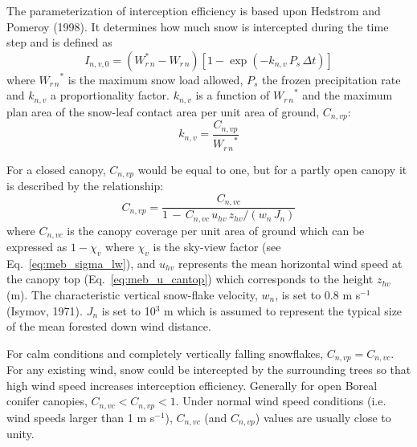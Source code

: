 The parameterization of interception efficiency 
is based upon 
Hedstrom and Pomeroy (1998)\nocite{Hedstrom98}. 
It determines how much
snow is intercepted during the time step and is defined as
%
\begin{equation}
  \label{eq:meb_rd_interceptsnow}
  I_{n,v,0} = \left(W_{r\,n}^\ast - W_{r\,n} \right) \left[1 -
    \exp\left(-k_{n,v}\,P_s\,\Delta t\right)\right]
\end{equation}
%
where ${W_{r\,n}}^\ast$ is the maximum snow load allowed, $P_s$ 
the frozen precipitation rate
and $k_{n,v}$ a proportionality factor. $k_{n,v}$ 
is a function of ${W_{r\,n}}^\ast$ and the maximum plan area of the 
snow-leaf contact area per unit area of ground, $C_{n,vp}$:
%
\begin{equation}
  \label{eq:meb_rd_coefsnowload}
  k_{n,v}=\frac{C_{n,vp}}{ {W_{r\,n}}^\ast}
\end{equation}


For a closed canopy, $C_{n,vp}$ would be equal to one, but for a
partly open canopy it is described by the relationship:
%
\begin{equation}
  \label{eq:meb_rd_closedcansnow}
  C_{n,vp}=\frac{C_{n,vc}}
{1 \,-\, C_{n,vc} \, u_{hv} \, z_{hv}/\left(w_n \, J_n\right)}
%
\end{equation}
%
where $C_{n,vc}$ is the canopy coverage per unit area of ground which
can be expressed as $1-\chi_{v}$ where $\chi_{v}$ is the sky-view
factor (see Eq.~\ref{eq:meb_sigma_lw}), and
$u_{hv}$ represents the mean horizontal wind speed at the canopy top (Eq.~\ref{eq:meb_u_cantop})
which corresponds to the height $z_{hv}$ (m).
The characteristic vertical snow-flake velocity, $w_n$,
is set to 0.8 m s$^{-1}$ 
(Isymov, 1971)\nocite{Isymov71}. 
$J_n$ 
is
set to 10$^3$ m which is assumed to represent the typical size of the
mean forested down wind distance. 

For calm conditions and completely vertically falling snowflakes,
$C_{n,vp}=C_{n,vc}$. For any existing wind, snow could be 
intercepted by the surrounding trees
so that
high wind speed increases interception efficiency. Generally for
open Boreal conifer canopies, $C_{n,vc} < C_{n,vp} < 1$. Under normal
wind speed conditions 
(i.e. wind speeds larger than 1 m s$^{-1}$), 
$C_{n,vc}$ (and $C_{n,vp}$) values are usually close to unity.


